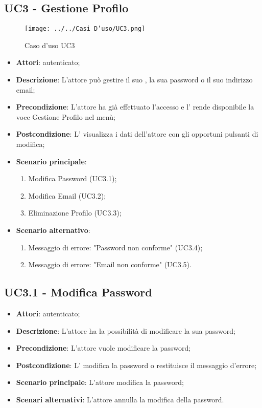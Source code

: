 \subsection{UC3 - Gestione Profilo}
\label{ssec:UC3}
\begin{figure}[h!]
\centering
\texttt{[image: ../../Casi D'uso/UC3.png]}
\caption{Caso d'uso UC3}
 \end{figure}
\begin{itemize}
\item \textbf{Attori}:  autenticato;
\item \textbf{Descrizione}: L'attore può gestire il suo , la sua password o il suo indirizzo email;
\item \textbf{Precondizione}: L'attore ha già effettuato l'accesso e l' rende disponibile la voce Gestione Profilo nel menù;
\item \textbf{Postcondizione}: L' visualizza i dati dell'attore con gli opportuni pulsanti di modifica;
\item \textbf{Scenario principale}:
	\begin{enumerate}\item Modifica Password (UC3.1);\item Modifica Email (UC3.2);\item Eliminazione Profilo (UC3.3);\end{enumerate}
\item \textbf{Scenario alternativo}:
	\begin{enumerate} \item Messaggio di errore: "Password non conforme" (UC3.4);\item Messaggio di errore: "Email non conforme" (UC3.5).
	\end{enumerate}
\end{itemize}
\subsection{UC3.1 - Modifica Password}
\label{ssec:UC3.1}
\begin{itemize}
\item \textbf{Attori}:  autenticato;
\item \textbf{Descrizione}: L'attore ha la possibilità di modificare la sua password;
\item \textbf{Precondizione}: L'attore vuole modificare la password;
\item \textbf{Postcondizione}: L' modifica la password o restituisce il messaggio d'errore;
\item \textbf{Scenario principale}: L'attore modifica la password;
\item \textbf{Scenari alternativi}: L'attore annulla la modifica della password.
\end{itemize}
